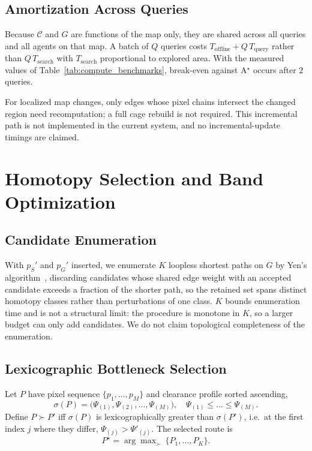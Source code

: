 \documentclass[conference]{IEEEtran}
\begin{document}
\subsection{Amortization Across Queries}

Because $\mathcal{C}$ and $G$ are functions of the map only, they are shared across all queries and all agents on that map. A batch of $Q$ queries costs $T_{\mathrm{offline}} + Q\,T_{\mathrm{query}}$ rather than $Q\,T_{\mathrm{search}}$ with $T_{\mathrm{search}}$ proportional to explored area. With the measured values of Table~\ref{tab:compute_benchmarks}, break-even against A$^\star$ occurs after $2$ queries.

For localized map changes, only edges whose pixel chains intersect the changed region need recomputation; a full cage rebuild is not required. This incremental path is not implemented in the current system, and no incremental-update timings are claimed.

\section{Homotopy Selection and Band Optimization}
\label{sec:opt}

\subsection{Candidate Enumeration}

With $p_S'$ and $p_G'$ inserted, we enumerate $K$ loopless shortest paths on $G$ by Yen's algorithm~\cite{yen1971}, discarding candidates whose shared edge weight with an accepted candidate exceeds a fraction of the shorter path, so the retained set spans distinct homotopy classes rather than perturbations of one class. $K$ bounds enumeration time and is not a structural limit: the procedure is monotone in $K$, so a larger budget can only add candidates. We do not claim topological completeness of the enumeration.

\subsection{Lexicographic Bottleneck Selection}

Let $P$ have pixel sequence $\{p_1,\dots,p_M\}$ and clearance profile sorted ascending,
\begin{equation}
\sigma(P)=\big(\Psi_{(1)},\Psi_{(2)},\dots,\Psi_{(M)}\big),\quad \Psi_{(1)}\le\dots\le\Psi_{(M)} .
\end{equation}
Define $P\succ P'$ iff $\sigma(P)$ is lexicographically greater than $\sigma(P')$, i.e.\ at the first index $j$ where they differ, $\Psi_{(j)}>\Psi'_{(j)}$. The selected route is
\begin{equation}
P^\star=\arg\max\nolimits_{\succ}\ \{P_1,\dots,P_K\} .
\label{eq:lex}
\end{equation}
\end{document}
